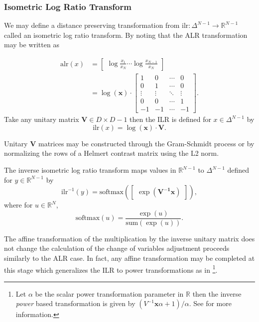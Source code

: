 \documentclass[11pt]{article}
\newcommand{\abs}[1]{\left| #1 \right|}
\begin{document}


\subsubsection{Isometric Log Ratio Transform}

We may define a distance preserving transformation from $\textrm{ilr}:\Delta^{N-1} \rightarrow \mathbb{R}^{N-1}$ called an isometric log ratio transform. By noting that the ALR transformation may be written as

\[
  \begin{aligned}
 \textrm{alr}(x) &= \begin{bmatrix}\displaystyle
    \log \frac{x_1}{x_N} \cdots \log \frac{x_{N-1}}{x_N}
  \end{bmatrix} \\
  &= \log(\mathbf{x}) \cdot \begin{bmatrix}\displaystyle
                    1 & 0 & \cdots & 0 \\
                    0 & 1 & \cdots & 0 \\
                    \vdots & \vdots & \ddots & \vdots \\
                    0 & 0 & \cdots & 1 \\
                    -1 & -1 & \cdots & -1
                    \end{bmatrix}.
  \end{aligned}
\]
Take any unitary matrix $\mathbf{V} \in D \times D - 1$ then the ILR is defined for $x \in \Delta^{N-1}$ by
\[
  \textrm{ilr}(x)
  = \log(\mathbf{x}) \cdot \mathbf{V}.
\]

Unitary $\mathbf{V}$ matrices may be constructed through the Gram-Schmidt process or by normalizing the rows of a Helmert contrast matrix using the L2 norm.

The inverse isometric log ratio transform maps values in
$\mathbb{R}^{N-1}$ to $\Delta^{N-1}$ defined for $y \in
\mathbb{R}^{N-1}$ by
\[
  \textrm{ilr}^{-1}(y)
  = \textrm{softmax}(\begin{bmatrix} \exp(\mathbf{V^{-1}} \mathbf{x} ) \end{bmatrix}),
\]
where for $u \in \mathbb{R}^N$,
\[
  \textrm{softmax}(u) = \frac{\exp(u)}{\textrm{sum}(\exp(u))}.
\]

The affine transformation of the multiplication by the inverse unitary matrix does not change
the calculation of the change of variables adjustment proceeds similarly to the ALR case. In fact, any affine transformation may be completed at this stage which generalizes the ILR to power transformations as in \cite{tsagris2011data}\footnote{
   Let $\alpha$ be the scalar power transformation parameter in $\mathbb{R}$ then the inverse \textit{power} based transformation is given by $(V^{-1} \mathbf{x} \alpha + 1) / \alpha$. See \cite{tsagris2011data} for more information.
}. 
\end{document}
